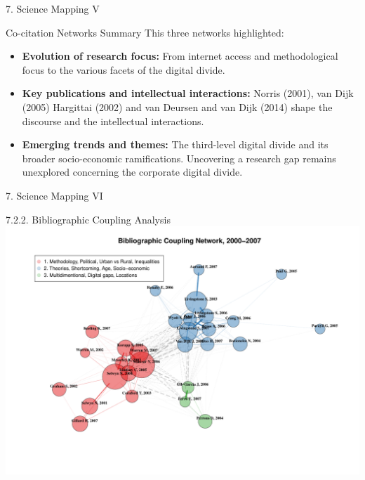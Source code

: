 \documentclass[
  ignorenonframetext,
]{beamer}
\begin{document}
\begin{frame}{7. Science Mapping V}
\protect\hypertarget{science-mapping-v}{}
\begin{block}{Co-citation Networks Summary}
\protect\hypertarget{co-citation-networks-summary}{}
This three networks highlighted:

\begin{itemize}
\item
  \textbf{Evolution of research focus:} From internet access and
  methodological focus to the various facets of the digital divide.
\item
  \textbf{Key publications and intellectual interactions:} Norris
  (2001), van Dijk (2005) Hargittai (2002) and van Deursen and van Dijk
  (2014) shape the discourse and the intellectual interactions.
\item
  \textbf{Emerging trends and themes:} The third-level digital divide
  and its broader socio-economic ramifications. Uncovering a research
  gap remains unexplored concerning the corporate digital divide.
\end{itemize}
\end{block}
\end{frame}

\begin{frame}{7. Science Mapping VI}
\protect\hypertarget{science-mapping-vi}{}
\begin{block}{7.2.2. Bibliographic Coupling Analysis}
\protect\hypertarget{bibliographic-coupling-analysis}{}
\includegraphics{Presentation_bibliometric_Madrid_june_20_files/figure-beamer/Bib_coup_P1-1.pdf}
\end{block}
\end{frame}
\end{document}
